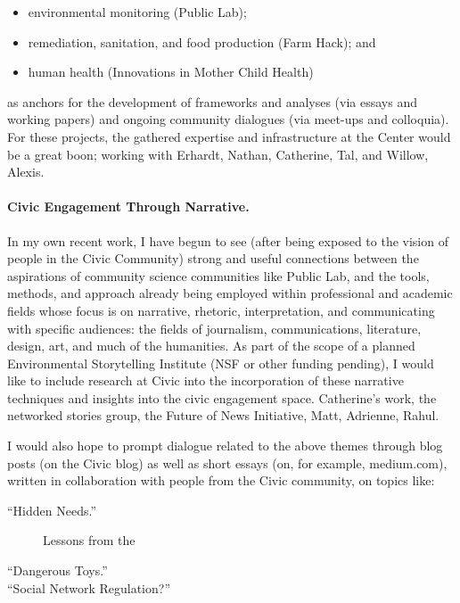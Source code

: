 \documentclass[12pt]{article}
\begin{document}
\begin{itemize}
\item environmental monitoring (Public Lab);
\item remediation, sanitation, and food production (Farm Hack); and 
\item human health (Innovations in Mother Child Health) 
\end{itemize}

as anchors for the development of frameworks and analyses (via essays and working papers) and ongoing community dialogues (via meet-ups and colloquia).  For these projects, the gathered expertise and infrastructure at the Center would be a great boon; working with Erhardt, Nathan, Catherine, Tal, and Willow, Alexis. 

\paragraph{Civic Engagement Through Narrative.} In my own recent work, I have begun to see (after being exposed to the vision of people in the Civic Community) strong and useful connections between the aspirations of community science communities like Public Lab, and the tools, methods, and approach already being employed within professional and academic fields whose focus is on narrative, rhetoric, interpretation, and communicating with specific audiences:  the fields of journalism, communications, literature, design, art, and much of the humanities.  As part of the scope of a planned Environmental Storytelling Institute (NSF or other funding pending), I would like to include research at Civic into the incorporation of these narrative techniques and insights into the civic engagement space. Catherine's work, the networked stories group, the Future of News Initiative, Matt, Adrienne, Rahul. 

I would also hope to prompt dialogue related to the above themes through blog posts (on the Civic blog) as well as short essays (on, for example, medium.com), written in collaboration with people from the Civic community, on topics like:

\begin{description}

\item[``Hidden Needs.''] Lessons from the 
\item[``Dangerous Toys.'']
\item[``Social Network Regulation?''] 

\end{description}
\end{document}
